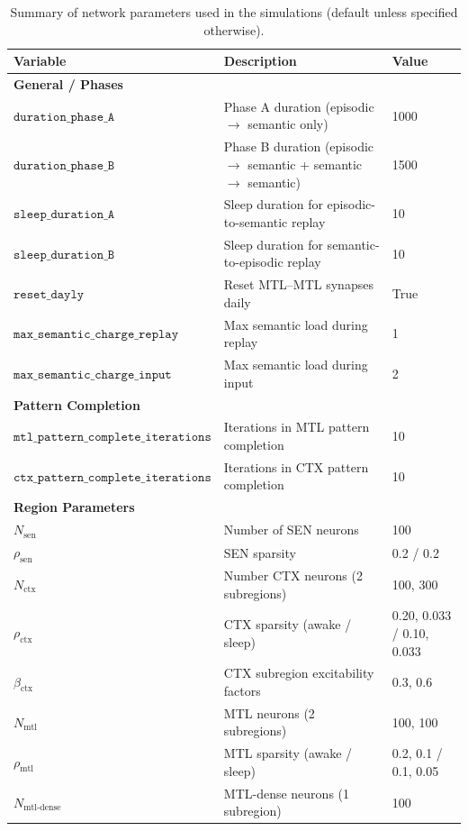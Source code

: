 \documentclass{article}
\begin{document}
\begin{table}[ht]
\small
\caption{Summary of network parameters used in the simulations (default unless specified otherwise).}
\label{tab:network_parameters}
\begin{tabular}{lp{6cm}l}
\toprule
\textbf{Variable} & \textbf{Description} & \textbf{Value} \\
\midrule
\multicolumn{3}{l}{\textbf{General / Phases}} \\
\midrule
$\texttt{duration\_phase\_A}$ & Phase A duration (episodic $\to$ semantic only) & 1000 \\
$\texttt{duration\_phase\_B}$ & Phase B duration (episodic $\to$ semantic + semantic $\to$ semantic) & 1500 \\
$\texttt{sleep\_duration\_A}$ & Sleep duration for episodic-to-semantic replay & 10 \\
$\texttt{sleep\_duration\_B}$ & Sleep duration for semantic-to-episodic replay & 10 \\
$\texttt{reset\_dayly}$ & Reset MTL–MTL synapses daily & True \\
$\texttt{max\_semantic\_charge\_replay}$ & Max semantic load during replay & 1 \\
$\texttt{max\_semantic\_charge\_input}$ & Max semantic load during input & 2 \\
\midrule
\multicolumn{3}{l}{\textbf{Pattern Completion}} \\
\midrule
$\texttt{mtl\_pattern\_complete\_iterations}$ & Iterations in MTL pattern completion & 10 \\
$\texttt{ctx\_pattern\_complete\_iterations}$ & Iterations in CTX pattern completion & 10 \\
\midrule
\multicolumn{3}{l}{\textbf{Region Parameters}} \\
\midrule
$N_{\text{sen}}$ & Number of SEN neurons & 100 \\
$\rho_{\text{sen}}$ & SEN sparsity & 0.2 / 0.2 \\
$N_{\text{ctx}}$ & Number CTX neurons (2 subregions) & 100, 300 \\
$\rho_{\text{ctx}}$ & CTX sparsity (awake / sleep) & 0.20, 0.033 / 0.10, 0.033 \\
$\beta_{\text{ctx}}$ & CTX subregion excitability factors & 0.3, 0.6 \\
$N_{\text{mtl}}$ & MTL neurons (2 subregions) & 100, 100 \\
$\rho_{\text{mtl}}$ & MTL sparsity (awake / sleep) & 0.2, 0.1 / 0.1, 0.05 \\
$N_{\text{mtl-dense}}$ & MTL-dense neurons (1 subregion) & 100 \\

\end{tabular}
\end{table}
\end{document}
